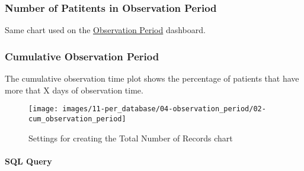 \documentclass[
]{book}
\begin{document}
\hypertarget{number-of-patitents-in-observation-period}{%
\subsubsection*{Number of Patitents in Observation Period}\label{number-of-patitents-in-observation-period}}

Same chart used on the \protect\hyperlink{numInObservationPeriod}{Observation Period} dashboard.

\hypertarget{cumulative-observation-period}{%
\subsubsection*{Cumulative Observation Period}\label{cumulative-observation-period}}

The cumulative observation time plot shows the percentage of patients that have more that X days of observation time.

\begin{figure}
\texttt{[image: images/11-per\_database/04-observation\_period/02-cum\_observation\_period]} \caption{Settings for creating the Total Number of Records chart}\label{fig:cumObservationTime}
\end{figure}

\hypertarget{sql-query-31}{%
\paragraph*{SQL Query}\label{sql-query-31}}
\end{document}
